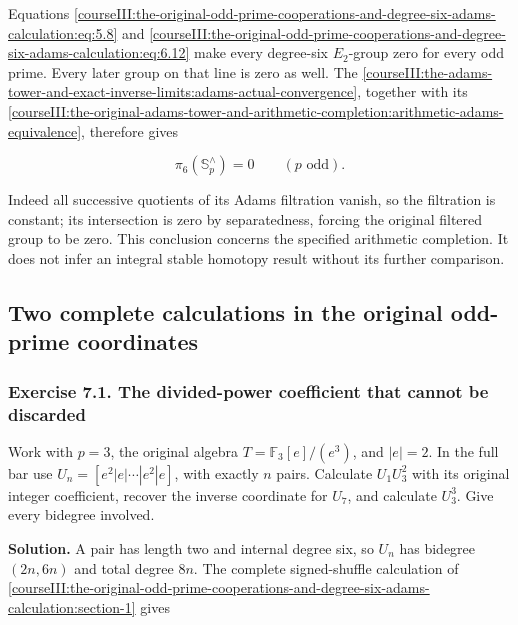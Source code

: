 Equations \eqref{courseIII:the-original-odd-prime-cooperations-and-degree-six-adams-calculation:eq:5.8} and \eqref{courseIII:the-original-odd-prime-cooperations-and-degree-six-adams-calculation:eq:6.12} make every degree-six \(E_2\)-group zero for every odd prime. Every later group on that line is zero as well. The \cref{courseIII:the-adams-tower-and-exact-inverse-limits:adams-actual-convergence}, together with its \cref{courseIII:the-original-adams-tower-and-arithmetic-completion:arithmetic-adams-equivalence}, therefore gives

\begin{equation}
\pi_6(\mathbb S^{\wedge}_p)=0\qquad(p\text{ odd}).
 \label{courseIII:the-original-odd-prime-cooperations-and-degree-six-adams-calculation:eq:6.13}
\end{equation}

Indeed all successive quotients of its Adams filtration vanish, so the filtration is constant; its intersection is zero by separatedness, forcing the original filtered group to be zero. This conclusion concerns the specified arithmetic completion. It does not infer an integral stable homotopy result without its further comparison.

\subsection{Two complete calculations in the original odd-prime coordinates}
\label{courseIII:the-original-odd-prime-cooperations-and-degree-six-adams-calculation:odd-exercises}

\label{courseIII:the-original-odd-prime-cooperations-and-degree-six-adams-calculation:section-7}

\subsubsection{Exercise 7.1. The divided-power coefficient that cannot be discarded}
\label{courseIII:the-original-odd-prime-cooperations-and-degree-six-adams-calculation:exercise-7.1}

\label{courseIII:odd-coop:7.1}

Work with \(p=3\), the original algebra \(T=\mathbb F_3[e]/(e^3)\), and \(|e|=2\). In the full bar use \(U_n=[e^2|e|\cdots|e^2|e]\), with exactly \(n\) pairs. Calculate \(U_1U_3^2\) with its original integer coefficient, recover the inverse coordinate for \(U_7\), and calculate \(U_3^3\). Give every bidegree involved.

\textbf{Solution.} A pair has length two and internal degree six, so \(U_n\) has bidegree \((2n,6n)\) and total degree \(8n\). The complete signed-shuffle calculation of \cref{courseIII:the-original-odd-prime-cooperations-and-degree-six-adams-calculation:section-1} gives

